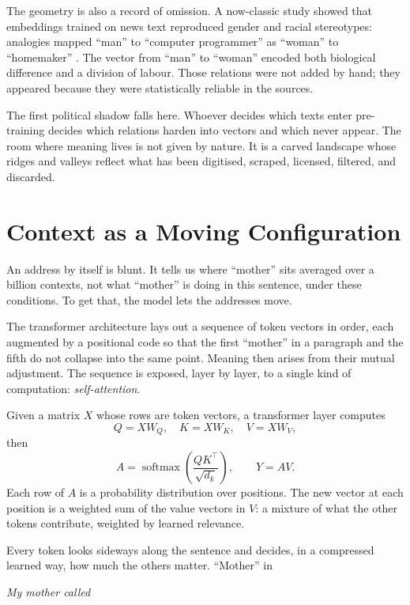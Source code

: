 \documentclass[12pt,a4paper]{article}
\begin{document}
The geometry is also a record of omission. A now-classic study showed that embeddings trained on news text reproduced gender and racial stereotypes: analogies mapped ``man'' to ``computer programmer'' as ``woman'' to ``homemaker'' \cite{bolukbasi2016man}. The vector from ``man'' to ``woman'' encoded both biological difference and a division of labour. Those relations were not added by hand; they appeared because they were statistically reliable in the sources.

The first political shadow falls here. Whoever decides which texts enter pre-training decides which relations harden into vectors and which never appear. The room where meaning lives is not given by nature. It is a carved landscape whose ridges and valleys reflect what has been digitised, scraped, licensed, filtered, and discarded.

\section{Context as a Moving Configuration}

An address by itself is blunt. It tells us where ``mother'' sits averaged over a billion contexts, not what ``mother'' is doing in this sentence, under these conditions. To get that, the model lets the addresses move.

The transformer architecture lays out a sequence of token vectors in order, each augmented by a positional code so that the first ``mother'' in a paragraph and the fifth do not collapse into the same point. Meaning then arises from their mutual adjustment. The sequence is exposed, layer by layer, to a single kind of computation: \emph{self-attention}.

\begin{formalbox}[title={Self-Attention as Weighted Mixing}]
Given a matrix $X$ whose rows are token vectors, a transformer layer computes
\[
Q = XW_Q,\quad K = XW_K,\quad V = XW_V,
\]
then
\[
A = \operatorname{softmax}\!\left(\frac{QK^\top}{\sqrt{d_k}}\right),\qquad Y = AV.
\]
Each row of $A$ is a probability distribution over positions. The new vector at each position is a weighted sum of the value vectors in $V$: a mixture of what the other tokens contribute, weighted by learned relevance.
\end{formalbox}

Every token looks sideways along the sentence and decides, in a compressed learned way, how much the others matter. ``Mother'' in

\medskip
\noindent\emph{My mother called}
\medskip
\end{document}

